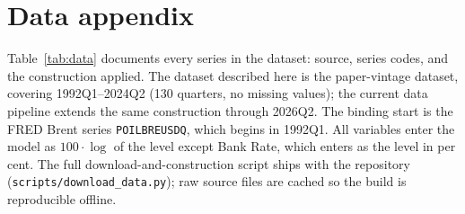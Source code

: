 \appendix

\section{Data appendix}
\label{app:data}

Table~\ref{tab:data} documents every series in the dataset: source, series codes, and the construction applied. The dataset described here is the paper-vintage dataset, covering 1992Q1--2024Q2 (130 quarters, no missing values); the current data pipeline extends the same construction through 2026Q2. The binding start is the FRED Brent series \texttt{POILBREUSDQ}, which begins in 1992Q1. All variables enter the model as $100\cdot\log$ of the level except Bank Rate, which enters as the level in per cent. The full download-and-construction script ships with the repository (\texttt{scripts/download\_data.py}); raw source files are cached so the build is reproducible offline.

